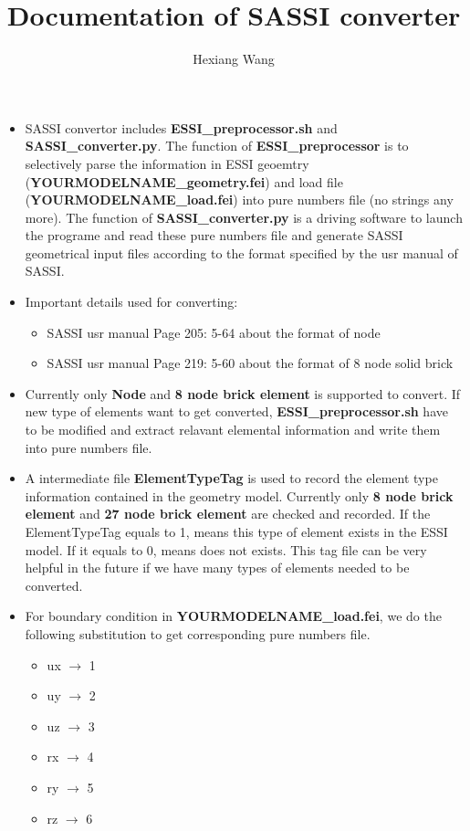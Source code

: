 \documentclass{article}
\begin{document}
\title{Documentation of SASSI converter}
\author{Hexiang Wang}
\maketitle


\begin{itemize}
	\item SASSI convertor includes \textbf{ESSI\_preprocessor.sh} and \textbf{SASSI\_converter.py}. The function of \textbf{ESSI\_preprocessor} is to selectively parse the information in ESSI geoemtry (\textbf{YOURMODELNAME\_geometry.fei}) and load file (\textbf{YOURMODELNAME\_load.fei}) into pure numbers file (no strings any more). The function of \textbf{SASSI\_converter.py} is a driving software to launch the programe and read these pure numbers file and generate SASSI geometrical input files according to the format specified by the usr manual of SASSI. 

	\item Important details used for converting: 

		\begin{itemize}

			\item SASSI usr manual Page 205: 5-64 about the format of node

			\item SASSI usr manual Page 219: 5-60 about the format of 8 node solid brick
		\end{itemize}

	\item Currently only \textbf{Node} and \textbf{8 node brick element} is supported to convert. If new type of elements want to get converted, \textbf{ESSI\_preprocessor.sh} have to be modified and extract relavant elemental information and write them into pure numbers file.

	\item A intermediate file \textbf{ElementTypeTag} is used to record the element type information contained in the geometry model. Currently only \textbf{8 node brick element} and \textbf{27 node brick element} are checked and recorded. If the ElementTypeTag equals to 1, means this type of element exists in the ESSI model. If it equals to 0, means does not exists. This tag file can be very helpful in the future if we have many types of elements needed to be converted. 


	\item For boundary condition in \textbf{YOURMODELNAME\_load.fei}, we do the following substitution to get corresponding pure numbers file. 

		\begin{itemize}		
		\item ux $\rightarrow$ 1 
		\item uy $\rightarrow$ 2
		\item uz $\rightarrow$ 3
		\item rx $\rightarrow$ 4 
		\item ry $\rightarrow$ 5
		\item rz $\rightarrow$ 6
		\end{itemize}

\end{itemize}
\end{document}
